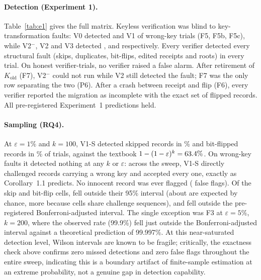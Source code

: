 
\label{sec:results}
\paragraph{Detection (Experiment 1).} Table~\ref{tab:e1} gives the full matrix.
Keyless verification was blind to key-transformation faults: V0 detected \akmVzeroWrongKey{} and V1 \akmVoneWrongKey{} of \akmWrongKeyTrials{} wrong-key trials (F5, F5b, F5c), while V2$^{-}$, V2 and V3 detected \akmVtwoMinusWrongKey{}, \akmVtwoWrongKey{} and \akmVthreeWrongKey{} respectively.
Every verifier detected every structural fault (skips, duplicates, bit-flips, edited receipts and roots) in every trial.
On \akmFzeroTrials{} honest verifier-trials, no verifier raised a false alarm.
After retirement of $K_\text{old}$ (F7), V2$^{-}$ could not run while V2 still detected the fault; F7 was the only row separating the two (P6).
After a crash between receipt and flip (F6), every verifier reported the migration as incomplete with the exact set of flipped records.
All pre-registered Experiment~1 predictions held.

\paragraph{Sampling (RQ4).} 
At $\varepsilon=1\%$ and $k=100$, V1-S detected skipped records in \akmRqFoneb{}\% and bit-flipped records in \akmRqFthree{}\% of trials, against the textbook $1-(1-\varepsilon)^k=63.4{}\%$.
On wrong-key faults it detected nothing at any $k$ or $\varepsilon$: across the sweep, V1-S directly challenged \akmRqFfiveChallenged{} records carrying a wrong key and accepted every one, exactly as Corollary~1.1 predicts.
No innocent record was ever flagged (\akmRqInnocent{} false flags).
Of the \akmRqChecked{} skip and bit-flip cells, \akmRqMissNinetyFive{} fell outside their 95\% interval (about \akmRqMissExpected{} are expected by chance, more because cells share challenge sequences), and \akmRqMissBonf{} fell outside the pre-registered Bonferroni-adjusted interval.
The single exception was F3 at $\varepsilon=5\%$, $k=200$, where the observed rate (99.9\%) fell just outside the Bonferroni-adjusted interval against a theoretical prediction of 99.997\%. At this near-saturated detection level, Wilson intervals are known to be fragile; critically, the exactness check above confirms zero missed detections and zero false flags throughout the entire sweep, indicating this is a boundary artifact of finite-sample estimation at an extreme probability, not a genuine gap in detection capability.

